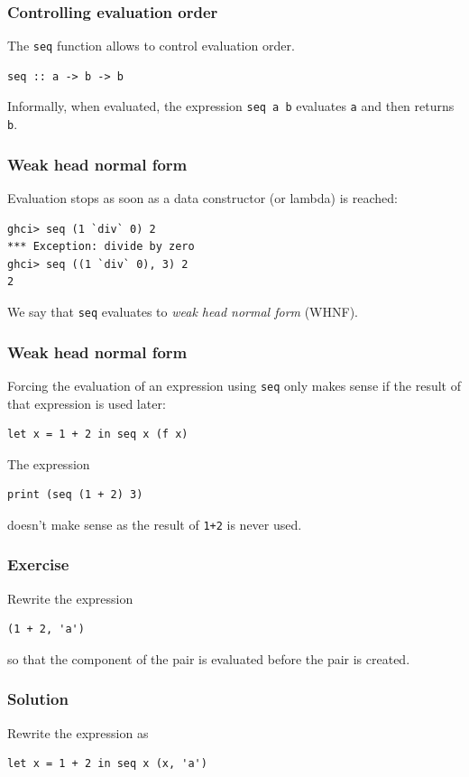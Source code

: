 \documentclass{beamer}
\begin{document}
\begin{frame}[fragile]
  \frametitle{Controlling evaluation order}

  The \lstinline!seq! function allows to control evaluation order.

  \begin{lstlisting}
seq :: a -> b -> b
  \end{lstlisting}

  Informally, when evaluated, the expression \lstinline!seq a b!
  evaluates \lstinline!a! and then returns \lstinline!b!.
\end{frame}

\begin{frame}[fragile]
  \frametitle{Weak head normal form}

  Evaluation stops as soon as a data constructor (or lambda) is
  reached:
  \begin{verbatim}
ghci> seq (1 `div` 0) 2
*** Exception: divide by zero
ghci> seq ((1 `div` 0), 3) 2
2
  \end{verbatim}
  We say that \lstinline!seq! evaluates to \emph{weak head normal
    form} (WHNF).
\end{frame}

\begin{frame}[fragile]
  \frametitle{Weak head normal form}

  Forcing the evaluation of an expression using \lstinline!seq! only
  makes sense if the result of that expression is used later:
  \begin{lstlisting}
let x = 1 + 2 in seq x (f x)
  \end{lstlisting}

  The expression
  \begin{lstlisting}
print (seq (1 + 2) 3)
  \end{lstlisting}
  doesn't make sense as the result of \lstinline!1+2! is never used.
\end{frame}

\begin{frame}[fragile]
  \frametitle{Exercise}

  Rewrite the expression
\begin{lstlisting}
(1 + 2, 'a')
\end{lstlisting}
so that the component of the pair is evaluated before the pair is
created.
\end{frame}

\begin{frame}[fragile]
  \frametitle{Solution}

  Rewrite the expression as
  \begin{lstlisting}
let x = 1 + 2 in seq x (x, 'a')
  \end{lstlisting}
\end{frame}
\end{document}
